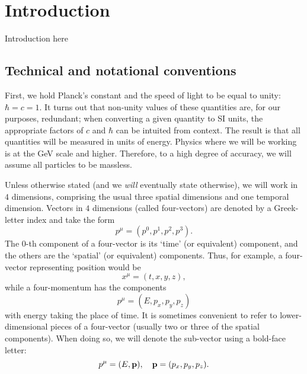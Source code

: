 \documentclass[12pt,twoside]{reedthesis}
\begin{document}
  \mainmatter %
  \pagestyle{fancyplain} %


\chapter*{Introduction}

	Introduction here

	\section{Technical and notational conventions}

	First, we hold Planck's constant and the speed of light to be equal to unity: $\hbar = c = 1$. It turns out that non-unity values of these quantities are, for our purposes, redundant; when converting a given quantity to SI units, the appropriate factors of $c$ and $\hbar$ can be intuited from context. The result is that all quantities will be measured in units of energy. Physics where we will be working is at the \si{\giga\electronvolt} scale and higher. Therefore, to a high degree of accuracy, we will assume all particles to be massless.

	Unless otherwise stated (and we \textit{will} eventually state otherwise), we will work in $4$ dimensions, comprising the usual three spatial dimensions and one temporal dimension. Vectors in $4$ dimensions (called four-vectors) are denoted by a Greek-letter index and take the form
	\begin{equation}
		p^\mu = (p^0, p^1, p^2, p^3).
	\end{equation}
	The $0$-th component of a four-vector is its `time' (or equivalent) component, and the others are the `spatial' (or equivalent) components. Thus, for example, a four-vector representing position would be
	\begin{equation}
		x^\mu = (t, x, y, z),
	\end{equation}
	while a four-momentum has the components
	\begin{equation}
		p^\mu = (E, p_x, p_y, p_z)
	\end{equation}
	with energy taking the place of time. It is sometimes convenient to refer to lower-dimensional pieces of a four-vector (usually two or three of the spatial components). When doing so, we will denote the sub-vector using a bold-face letter:
	\begin{equation}
		p^\mu = (E, \vb{p}), \quad \vb{p} = (p_x, p_y, p_z).
	\end{equation}
\end{document}

